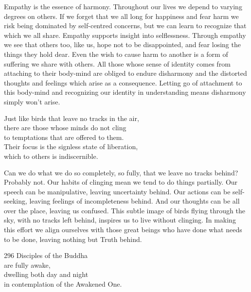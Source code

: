 \begin{dhpRefl}
  Empathy is the essence of harmony. Throughout our lives we depend to varying
  degrees on others. If we forget that we all long for happiness and fear harm
  we risk being dominated by self-centred concerns, but we can learn to
  recognize that which we all share. Empathy supports insight into selflessness.
  Through empathy we see that others too, like us, hope not to be disappointed,
  and fear losing the things they hold dear. Even the wish to cause harm to
  another is a form of suffering we share with others. All those whose sense of
  identity comes from attaching to their body-mind are obliged to endure
  disharmony and the distorted thoughts and feelings which arise as a
  consequence. Letting go of attachment to this body-mind and recognizing our
  identity in understanding means disharmony simply won’t arise.
\end{dhpRefl}


\begin{dhpVerse}{92}
\label{dhp-92}
Just like birds that leave no tracks in the air,\\
there are those whose minds do not cling\\
to temptations that are offered to them.\\
Their focus is the signless state of liberation,\\
which to others is indiscernible.
\end{dhpVerse}

\begin{dhpRefl}
  Can we do what we do so completely, so fully, that we leave no tracks behind?
  Probably not. Our habits of clinging mean we tend to do things partially. Our
  speech can be manipulative, leaving uncertainty behind. Our actions can be
  self-seeking, leaving feelings of incompleteness behind. And our thoughts can
  be all over the place, leaving us confused. This subtle image of birds flying
  through the sky, with no tracks left behind, inspires us to live without
  clinging. In making this effort we align ourselves with those great beings who
  have done what needs to be done, leaving nothing but Truth behind.
\end{dhpRefl}


\begin{dhpVerse}{296}
\label{dhp-296}
Disciples of the Buddha\\
are fully awake,\\
dwelling both day and night\\
in contemplation of the Awakened One. 
\end{dhpVerse}


